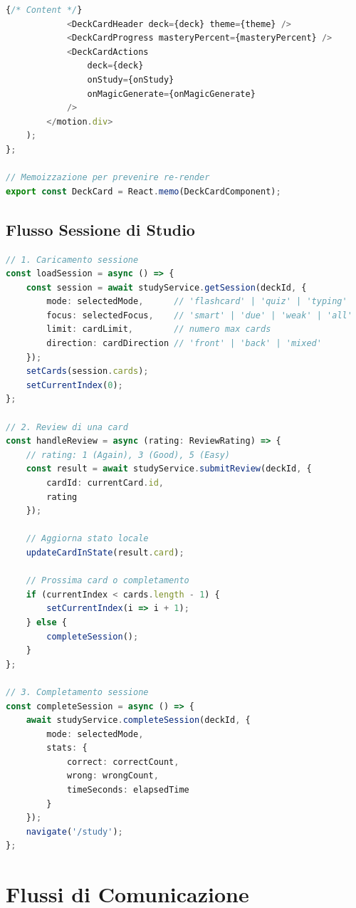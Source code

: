 \documentclass[11pt,a4paper]{article}
\begin{document}
\begin{lstlisting}[language=TypeScript, caption={DeckCard Component}]
            {/* Content */}
            <DeckCardHeader deck={deck} theme={theme} />
            <DeckCardProgress masteryPercent={masteryPercent} />
            <DeckCardActions 
                deck={deck} 
                onStudy={onStudy}
                onMagicGenerate={onMagicGenerate}
            />
        </motion.div>
    );
};

// Memoizzazione per prevenire re-render
export const DeckCard = React.memo(DeckCardComponent);
\end{lstlisting}

\subsection{Flusso Sessione di Studio}\label{subsec:study-session}

\begin{lstlisting}[language=TypeScript, caption={Study Session Flow}]
// 1. Caricamento sessione
const loadSession = async () => {
    const session = await studyService.getSession(deckId, {
        mode: selectedMode,      // 'flashcard' | 'quiz' | 'typing'
        focus: selectedFocus,    // 'smart' | 'due' | 'weak' | 'all'
        limit: cardLimit,        // numero max cards
        direction: cardDirection // 'front' | 'back' | 'mixed'
    });
    setCards(session.cards);
    setCurrentIndex(0);
};

// 2. Review di una card
const handleReview = async (rating: ReviewRating) => {
    // rating: 1 (Again), 3 (Good), 5 (Easy)
    const result = await studyService.submitReview(deckId, {
        cardId: currentCard.id,
        rating
    });
    
    // Aggiorna stato locale
    updateCardInState(result.card);
    
    // Prossima card o completamento
    if (currentIndex < cards.length - 1) {
        setCurrentIndex(i => i + 1);
    } else {
        completeSession();
    }
};

// 3. Completamento sessione
const completeSession = async () => {
    await studyService.completeSession(deckId, {
        mode: selectedMode,
        stats: {
            correct: correctCount,
            wrong: wrongCount,
            timeSeconds: elapsedTime
        }
    });
    navigate('/study');
};
\end{lstlisting}

\section{Flussi di Comunicazione}\label{sec:communication}
\end{document}
